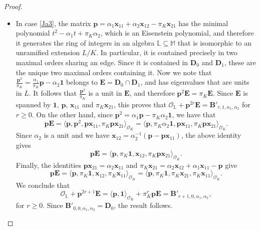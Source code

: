 \documentclass{amsart}
\theoremstyle{definition}
\newcommand\lu{\mathbb{L}}
\newcommand\alge{\mathbb{M}}
\newcommand\oink{\mathcal O}
\newcommand\Ba{\mathbf B}
\newcommand\Da{\mathbf{D}}
\newcommand\Ea{\mathbf{E}}
\begin{document}
\begin{proof}
\begin{itemize}
    isomorphic to an unramified extension, and 
    therefore
    it is contained in a unique maximal order, 
    which must be
    $\Da_0$, since $\mathbf{u}$ has integral 
    coefficients. Since $\pi_K^n\mathbf{x}_{22}=
    \pi_K^n\mathbf{1}-\pi_K^n\mathbf{x}_{11}$ and
    $\pi_K^n\mathbf{x}_{12}=
    \pi_K^n\mathbf{u}-\pi_K^n\mathbf{x}_{11}
    +\pi_K^n\epsilon\mathbf{x}_{21}$, we conclude
    that $\pi_K^n\Da_0\subseteq\Ba_{n,\epsilon}$,
    whence the result follows.
    \item
    In case \ref{Ja3}, the matrix 
    $\mathbf{p}=
    \alpha_1\mathbf{x}_{11}+
    \alpha_2\mathbf{x}_{12}-
    \pi_K\mathbf{x}_{21}$ 
    has the minimal polynomial
    $t^2-\alpha_1t+\pi_K\alpha_2$, 
    which is an Eisenstein 
    polynomial, and therefore it generates 
    the ring of integers
    in an algebra $\lu\subseteq\alge$ that is 
    isomorphic to an unramified extension $L/K$. 
    In particular, it is contained precisely in 
    two maximal orders sharing an edge.
    Since it is contained in $\Da_0$ and $\Da_1$,
    these are the unique two maximal orders containing it.
    Now we note that $\frac{\mathbf{p}^2}{\pi_K}=
    \frac{\alpha_1}{\pi_K}\mathbf{p}-\alpha_2\mathbf{1}$
    belongs to $\Ea=\Da_0\cap\Da_1$, and has eigenvalues that
    are units in $L$. It follows that $\frac{\mathbf{p}^2}
    {\pi_K}$ is a unit in $\Ea$, and therefore 
    $\mathbf{p}^2\Ea=\pi_K\Ea$. Since $\Ea$ is spanned by
    $\mathbf{1}$, $\mathbf{p}$, $\mathbf{x}_{11}$
    and $\pi_K\mathbf{x}_{21}$, this proves that
    $\oink_{\lu}+\mathbf{p}^{2r}\Ea=
    \Ba'_{r,1,\alpha_1,\alpha_2}$ for $r\geq0$.
    On the other hand, since
    $\mathbf{p}^2=
    \alpha_1\mathbf{p}-\pi_K\alpha_2\mathbf{1}$,
    we have that
    $$\mathbf{p}\Ea=
    \langle\mathbf{p},\mathbf{p}^2,
    \mathbf{p}\mathbf{x}_{11},
    \pi_K\mathbf{p}\mathbf{x}_{21}
    \rangle_{\oink_K}=
    \langle\mathbf{p},\pi_K\alpha_2\mathbf{1},
    \mathbf{p}\mathbf{x}_{11},
    \pi_K\mathbf{p}\mathbf{x}_{21}
    \rangle_{\oink_K}.$$
    Since $\alpha_2$ is a unit and we have 
    $\mathbf{x}_{12}=\alpha_2^{-1}
    \left(\mathbf{p}-\mathbf{p}
    \mathbf{x}_{11}\right)$, the above identity gives
    $$\mathbf{p}\Ea=\langle\mathbf{p},
    \pi_K\mathbf{1},\mathbf{x}_{12},
    \pi_K\mathbf{p}\mathbf{x}_{21}
    \rangle_{\oink_K}.$$
    Finally, the identities
    $\mathbf{p}\mathbf{x}_{21}=
    \alpha_2\mathbf{x}_{11}$ and
    $\pi_K\mathbf{x}_{21}=\alpha_2\mathbf{x}_{12}+
    \alpha_1\mathbf{x}_{11}-\mathbf{p}$
    give
    $$\mathbf{p}\Ea=
    \langle\mathbf{p},\pi_K\mathbf{1},
    \mathbf{x}_{12},
    \pi_K\mathbf{x}_{11}\rangle_{\oink_K}
    =\langle\mathbf{p},
    \pi_K\mathbf{1},\pi_K\mathbf{x}_{21},
    \pi_K\mathbf{x}_{11}
    \rangle_{\oink_K}.$$
    We conclude that $$\oink_{\lu}+
    \mathbf{p}^{2r+1}\Ea=
    \langle\mathbf{p},
    \mathbf{1}\rangle_{\oink_K}+
    \pi_K^r\mathbf{p}\Ea=
    \Ba'_{r+1,0,\alpha_1,\alpha_2},$$
    for $r\geq0$.
    Since $\Ba'_{0,0,\alpha_1,\alpha_2}=\Da_0$,
    the result follows.
    \end{itemize}
\end{proof}
\end{document}
